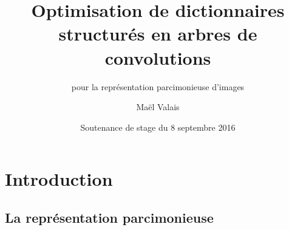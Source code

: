 


\title{Optimisation de dictionnaires structurés en arbres de convolutions}
\subtitle{pour la représentation parcimonieuse d'images}


\author{Maël Valais}
\date{Soutenance de stage du 8 septembre 2016}





\maketitle

\section{Introduction}
\subsection{La représentation parcimonieuse}

